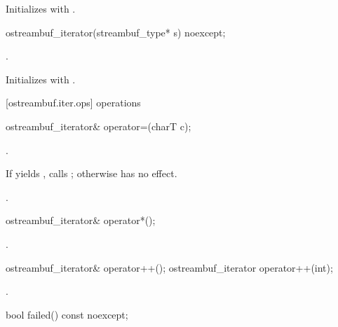 \begin{itemdescr}
\pnum
\effects
Initializes  with .
\end{itemdescr}

%
\begin{itemdecl}
ostreambuf_iterator(streambuf_type* s) noexcept;
\end{itemdecl}

\begin{itemdescr}
\pnum
\requires
{}.

\pnum
\effects
Initializes  with .
\end{itemdescr}

[ostreambuf.iter.ops]{ operations}

%
\begin{itemdecl}
ostreambuf_iterator&
  operator=(charT c);
\end{itemdecl}

\begin{itemdescr}
\pnum
\requires {}.

\pnum
\effects
If
yields
,
calls
;
otherwise has no effect.

\pnum
\returns
{}.
\end{itemdescr}

%
\begin{itemdecl}
ostreambuf_iterator& operator*();
\end{itemdecl}

\begin{itemdescr}
\pnum
\returns
{}.
\end{itemdescr}

%
\begin{itemdecl}
ostreambuf_iterator& operator++();
ostreambuf_iterator operator++(int);
\end{itemdecl}

\begin{itemdescr}
\pnum
\returns
{}.
\end{itemdescr}

%
\begin{itemdecl}
bool failed() const noexcept;
\end{itemdecl}

